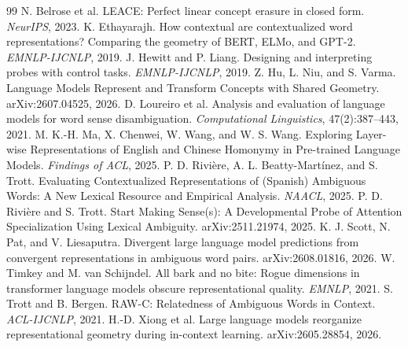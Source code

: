\documentclass[10pt,twocolumn]{article}
\begin{document}
\begin{thebibliography}{99}\small
{} N. Belrose et al. LEACE: Perfect linear concept erasure in closed form. \emph{NeurIPS}, 2023.
 K. Ethayarajh. How contextual are contextualized word representations? Comparing the geometry of BERT, ELMo, and GPT-2. \emph{EMNLP-IJCNLP}, 2019.
 J. Hewitt and P. Liang. Designing and interpreting probes with control tasks. \emph{EMNLP-IJCNLP}, 2019.
 Z. Hu, L. Niu, and S. Varma. Language Models Represent and Transform Concepts with Shared Geometry. arXiv:2607.04525, 2026.
 D. Loureiro et al. Analysis and evaluation of language models for word sense disambiguation. \emph{Computational Linguistics}, 47(2):387--443, 2021.
 M. K.-H. Ma, X. Chenwei, W. Wang, and W. S. Wang. Exploring Layer-wise Representations of English and Chinese Homonymy in Pre-trained Language Models. \emph{Findings of ACL}, 2025.
 P. D. Rivi\`ere, A. L. Beatty-Mart\'inez, and S. Trott. Evaluating Contextualized Representations of (Spanish) Ambiguous Words: A New Lexical Resource and Empirical Analysis. \emph{NAACL}, 2025.
 P. D. Rivi\`ere and S. Trott. Start Making Sense(s): A Developmental Probe of Attention Specialization Using Lexical Ambiguity. arXiv:2511.21974, 2025.
 K. J. Scott, N. Pat, and V. Liesaputra. Divergent large language model predictions from convergent representations in ambiguous word pairs. arXiv:2608.01816, 2026.
 W. Timkey and M. van Schijndel. All bark and no bite: Rogue dimensions in transformer language models obscure representational quality. \emph{EMNLP}, 2021.
 S. Trott and B. Bergen. RAW-C: Relatedness of Ambiguous Words in Context. \emph{ACL-IJCNLP}, 2021.
 H.-D. Xiong et al. Large language models reorganize representational geometry during in-context learning. arXiv:2605.28854, 2026.
\end{thebibliography}
\end{document}
